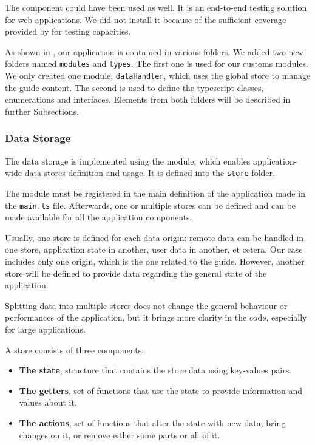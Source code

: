 The  component could have been used as well. It is an end-to-end testing solution for web applications. We did not install it because of the sufficient coverage provided by  for testing capacities.

As shown in , our application is contained in various folders. We added two new folders named \texttt{modules} and \texttt{types}. The first one is used for our customs modules. We only created one module, \texttt{dataHandler}, which uses the global store to manage the guide content. The second is used to define the \gls{typescript} classes, enumerations and interfaces. Elements from both folders will be described in further Subsections.

\subsubsection{Data Storage}
\label{subsubsec:app_implementation_basics_storage}

The data storage is implemented using the  module, which enables application-wide data stores definition and usage. It is defined into the \texttt{store} folder.

The module must be registered in the main definition of the  application made in the \texttt{main.ts} file. Afterwards, one or multiple stores can be defined and can be made available for all the application components.

Usually, one store is defined for each data origin: remote data can be handled in one store, application state in another, user data in another, et cetera. Our case includes only one origin, which is the one related to the guide. However, another store will be defined to provide data regarding the general state of the application.

Splitting data into multiple stores does not change the general behaviour or performances of the application, but it brings more clarity in the code, especially for large applications. 

A store consists of three components:
\begin{itemize}
	\item \textbf{The state}, structure that contains the store data using key-values pairs.
	\item \textbf{The getters}, set of functions that use the state to provide information and values about it.
	\item \textbf{The actions}, set of functions that alter the state with new data, bring changes on it, or remove either some parts or all of it.
\end{itemize}

